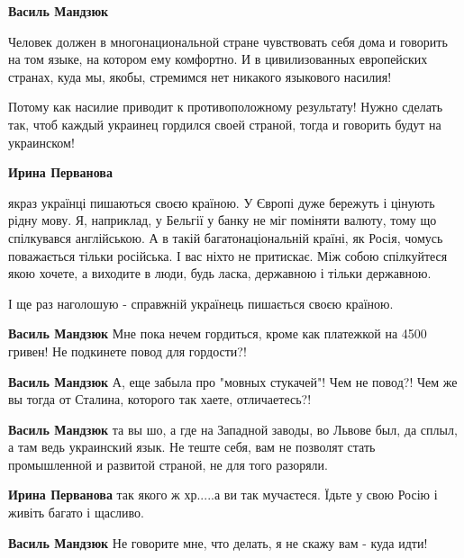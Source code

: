 \begin{itemize}
\begin{itemize}
\textbf{Василь Мандзюк} 

Человек должен в многонациональной стране чувствовать себя дома и говорить на
том языке, на котором ему комфортно. И в цивилизованных европейских странах,
куда мы, якобы, стремимся нет никакого языкового насилия!

Потому как насилие приводит к противоположному результату! Нужно сделать так,
чтоб каждый украинец гордился своей страной, тогда и говорить будут на
украинском!


\textbf{Ирина Перванова} 

якраз українці пишаються своєю країною. У Європі дуже бережуть і цінують рідну
мову. Я, наприклад, у Бельгії у банку не міг поміняти валюту, тому що
спілкувався англійською. А в такій багатонаціональній країні, як Росія, чомусь
поважається тільки російська. І вас ніхто не притискає. Між собою спілкуйтеся
якою хочете, а виходите в люди, будь ласка, державною і тільки державною.

І ще раз наголошую - справжній українець пишається своєю країною.

\textbf{Василь Мандзюк} Мне пока нечем гордиться, кроме как платежкой на 4500 гривен! Не подкинете повод для гордости?!

\textbf{Василь Мандзюк} А, еще забыла про "мовных стукачей"! Чем не повод?! Чем
же вы тогда от Сталина, которого так хаете, отличаетесь?!

\textbf{Василь Мандзюк} та вы шо, а где на Западной заводы, во Львове был, да
сплыл, а там ведь украинский язык. Не теште себя, вам не позволят стать
промышленной и развитой страной, не для того разоряли.

\textbf{Ирина Перванова} так якого ж хр.....а ви так мучаєтеся. Їдьте у свою Росію і живіть багато і щасливо.

\textbf{Василь Мандзюк} Не говорите мне, что делать, я не скажу вам - куда идти!


\end{itemize}
\end{itemize}
